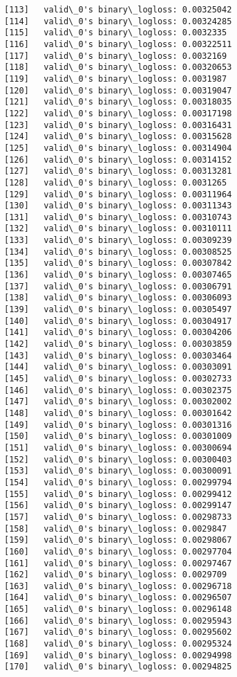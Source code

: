 \documentclass[11pt]{article}
\begin{document}
\begin{Verbatim}[commandchars=\\\{\}]
[113]	valid\_0's binary\_logloss: 0.00325042
[114]	valid\_0's binary\_logloss: 0.00324285
[115]	valid\_0's binary\_logloss: 0.0032335
[116]	valid\_0's binary\_logloss: 0.00322511
[117]	valid\_0's binary\_logloss: 0.0032169
[118]	valid\_0's binary\_logloss: 0.00320653
[119]	valid\_0's binary\_logloss: 0.0031987
[120]	valid\_0's binary\_logloss: 0.00319047
[121]	valid\_0's binary\_logloss: 0.00318035
[122]	valid\_0's binary\_logloss: 0.00317198
[123]	valid\_0's binary\_logloss: 0.00316431
[124]	valid\_0's binary\_logloss: 0.00315628
[125]	valid\_0's binary\_logloss: 0.00314904
[126]	valid\_0's binary\_logloss: 0.00314152
[127]	valid\_0's binary\_logloss: 0.00313281
[128]	valid\_0's binary\_logloss: 0.0031265
[129]	valid\_0's binary\_logloss: 0.00311964
[130]	valid\_0's binary\_logloss: 0.00311343
[131]	valid\_0's binary\_logloss: 0.00310743
[132]	valid\_0's binary\_logloss: 0.00310111
[133]	valid\_0's binary\_logloss: 0.00309239
[134]	valid\_0's binary\_logloss: 0.00308525
[135]	valid\_0's binary\_logloss: 0.00307842
[136]	valid\_0's binary\_logloss: 0.00307465
[137]	valid\_0's binary\_logloss: 0.00306791
[138]	valid\_0's binary\_logloss: 0.00306093
[139]	valid\_0's binary\_logloss: 0.00305497
[140]	valid\_0's binary\_logloss: 0.00304917
[141]	valid\_0's binary\_logloss: 0.00304206
[142]	valid\_0's binary\_logloss: 0.00303859
[143]	valid\_0's binary\_logloss: 0.00303464
[144]	valid\_0's binary\_logloss: 0.00303091
[145]	valid\_0's binary\_logloss: 0.00302733
[146]	valid\_0's binary\_logloss: 0.00302375
[147]	valid\_0's binary\_logloss: 0.00302002
[148]	valid\_0's binary\_logloss: 0.00301642
[149]	valid\_0's binary\_logloss: 0.00301316
[150]	valid\_0's binary\_logloss: 0.00301009
[151]	valid\_0's binary\_logloss: 0.00300694
[152]	valid\_0's binary\_logloss: 0.00300403
[153]	valid\_0's binary\_logloss: 0.00300091
[154]	valid\_0's binary\_logloss: 0.00299794
[155]	valid\_0's binary\_logloss: 0.00299412
[156]	valid\_0's binary\_logloss: 0.00299147
[157]	valid\_0's binary\_logloss: 0.00298733
[158]	valid\_0's binary\_logloss: 0.0029847
[159]	valid\_0's binary\_logloss: 0.00298067
[160]	valid\_0's binary\_logloss: 0.00297704
[161]	valid\_0's binary\_logloss: 0.00297467
[162]	valid\_0's binary\_logloss: 0.0029709
[163]	valid\_0's binary\_logloss: 0.00296718
[164]	valid\_0's binary\_logloss: 0.00296507
[165]	valid\_0's binary\_logloss: 0.00296148
[166]	valid\_0's binary\_logloss: 0.00295943
[167]	valid\_0's binary\_logloss: 0.00295602
[168]	valid\_0's binary\_logloss: 0.00295324
[169]	valid\_0's binary\_logloss: 0.00294998
[170]	valid\_0's binary\_logloss: 0.00294825

\end{Verbatim}
\end{document}
